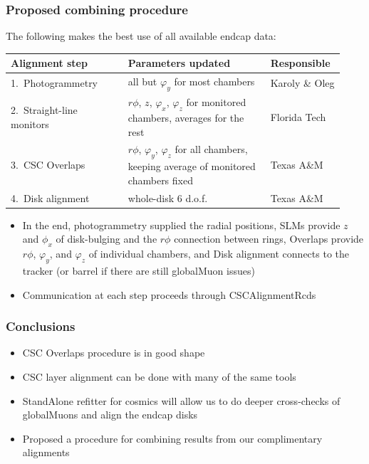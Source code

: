 \documentclass[compress]{beamer}
\begin{document}
\begin{frame}
\frametitle{Proposed combining procedure}

The following makes the best use of all available endcap data:

\vspace{0.2 cm}
\renewcommand{\arraystretch}{1.3}
\begin{tabular}{p{0.33\linewidth} p{0.4\linewidth} p{0.2\linewidth}}
Alignment step & Parameters updated & Responsible \\ \hline\hline
1.\ Photogrammetry & all but $\varphi_y$ for most chambers & Karoly \& Oleg \\ \hline
2.\ Straight-line monitors & $r\phi$, $z$, $\varphi_x$, $\varphi_z$ for monitored chambers, averages for the rest & Florida Tech \\ \hline
3.\ CSC Overlaps & $r\phi$, $\varphi_y$, $\varphi_z$ for all chambers, keeping average of monitored chambers fixed & Texas A\&M \\ \hline
4.\ Disk alignment & whole-disk 6 d.o.f.\ & Texas A\&M \\ \hline\hline
\end{tabular}

\vfill
\begin{itemize}
\item In the end, photogrammetry supplied the radial positions, SLMs
  provide $z$ and $\phi_x$ of disk-bulging and the $r\phi$ connection
  between rings, Overlaps provide $r\phi$, $\varphi_y$, and
  $\varphi_z$ of individual chambers, and Disk alignment connects to
  the tracker (or barrel if there are still globalMuon issues)
\item Communication at each step proceeds through CSCAlignmentRcds
\end{itemize}
\end{frame}

\begin{frame}
\frametitle{Conclusions}
\begin{itemize}\setlength{\itemsep}{0.75 cm}
\item CSC Overlaps procedure is in good shape

\item CSC layer alignment can be done with many of the same tools

\item StandAlone refitter for cosmics will allow us to do deeper
  cross-checks of globalMuons and align the endcap disks

\item Proposed a procedure for combining results from our
  complimentary alignments
\end{itemize}

\vfill
\mbox{ }
\label{numpages}
\end{frame}
\end{document}
